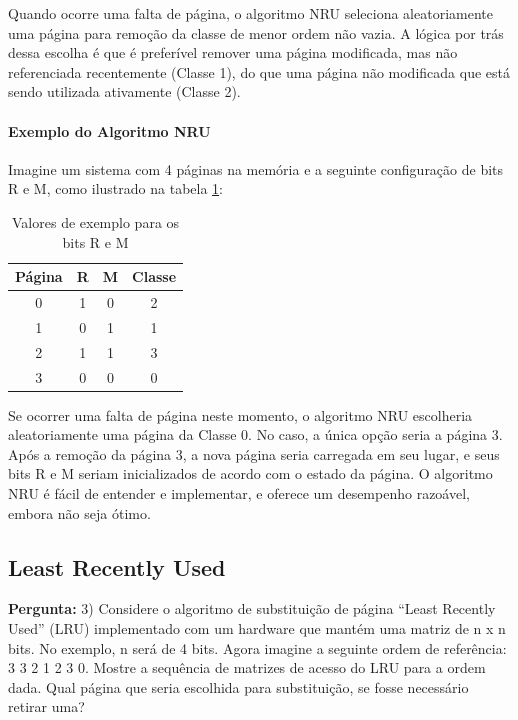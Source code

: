 \documentclass{article}
\begin{document}
Quando ocorre uma falta de página, o algoritmo NRU seleciona aleatoriamente uma página para remoção da classe de menor ordem não vazia. A lógica por trás dessa escolha é que é preferível remover uma página modificada, mas não referenciada recentemente (Classe 1), do que uma página não modificada que está sendo utilizada ativamente (Classe 2).

\newpage
\paragraph {Exemplo do Algoritmo NRU\newline}

Imagine um sistema com 4 páginas na memória e a seguinte configuração de bits R e M, como ilustrado na tabela \ref{tab:ReM}:
\begin{table}[h!]
    \centering
    \begin{tabular}{|c|c|c|c|}
    \hline
    \textbf{Página} & \textbf{R} & \textbf{M} & \textbf{Classe} \\ \hline
    0 & 1 & 0 & 2 \\ \hline
    1 & 0 & 1 & 1 \\ \hline
    2 & 1 & 1 & 3 \\ \hline
    3 & 0 & 0 & 0 \\ \hline
    \end{tabular}
    \caption{Valores de exemplo para os bits R e M}
    \label{tab:ReM}
\end{table}

Se ocorrer uma falta de página neste momento, o algoritmo NRU escolheria aleatoriamente uma página da Classe 0. No caso, a única opção seria a página 3. Após a remoção da página 3, a nova página seria carregada em seu lugar, e seus bits R e M seriam inicializados de acordo com o estado da página. O algoritmo NRU é fácil de entender e implementar, e oferece um desempenho razoável, embora não seja ótimo.

\subsection{Least Recently Used}

\textbf{Pergunta:} 3) Considere o algoritmo de substituição de página “Least Recently Used” (LRU) implementado com um hardware que mantém uma matriz de n x n bits. No exemplo, n será de 4 bits. Agora imagine a seguinte ordem de referência: 3 3 2 1 2 3 0. Mostre a sequência de matrizes de acesso do LRU para a ordem dada. Qual página que seria escolhida para substituição, se fosse necessário retirar uma?  \newline
\end{document}
